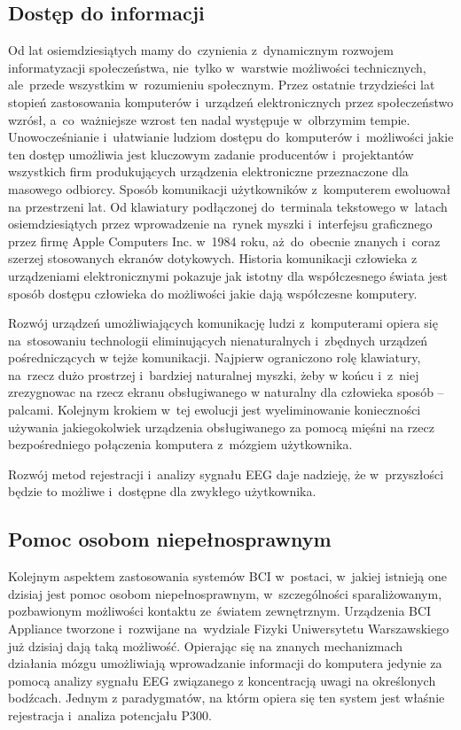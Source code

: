 \documentclass[licencjacka,openright]{pracamgr}
\begin{document}
\subsection{Dostęp do informacji}
Od lat osiemdziesiątych mamy do~czynienia z~dynamicznym rozwojem informatyzacji społeczeństwa, nie~tylko w~warstwie możliwości technicznych, ale~przede wszystkim w~rozumieniu społecznym. Przez ostatnie trzydzieści lat stopień zastosowania komputerów i~urządzeń elektronicznych przez społeczeństwo wzrósł, a~co~ważniejsze wzrost ten nadal występuje w~olbrzymim tempie. Unowocześnianie i~ułatwianie ludziom dostępu do~komputerów i~możliwości jakie ten dostęp umożliwia jest kluczowym zadanie producentów i~projektantów wszystkich firm produkujących urządzenia elektroniczne przeznaczone dla masowego odbiorcy. Sposób komunikacji użytkowników z~komputerem ewoluował na przestrzeni lat. Od klawiatury podłączonej do~terminala tekstowego w~latach osiemdziesiątych przez wprowadzenie na~rynek myszki i~interfejsu graficznego przez firmę Apple Computers Inc. w~1984 roku, aż~do~obecnie znanych i~coraz szerzej stosowanych ekranów dotykowych. Historia komunikacji człowieka z urządzeniami elektronicznymi pokazuje jak istotny dla współczesnego świata jest sposób dostępu człowieka do możliwości jakie dają współczesne komputery.

Rozwój urządzeń umożliwiających komunikację ludzi z~komputerami opiera się na~stosowaniu technologii eliminujących nienaturalnych i~zbędnych urządzeń pośredniczących w tejże komunikacji. Najpierw ograniczono rolę klawiatury, na~rzecz dużo prostrzej i~bardziej naturalnej myszki, żeby w końcu i~z~niej zrezygnowac na rzecz ekranu obsługiwanego w naturalny dla człowieka sposób -- palcami. Kolejnym krokiem w~tej ewolucji jest wyeliminowanie konieczności używania jakiegokolwiek urządzenia obsługiwanego za pomocą mięśni na rzecz bezpośredniego połączenia komputera z~mózgiem użytkownika.

Rozwój metod rejestracji i~analizy sygnału EEG daje nadzieję, że w~przyszłości będzie to możliwe i~dostępne dla zwykłego użytkownika.
\subsection{Pomoc osobom niepełnosprawnym}
Kolejnym aspektem zastosowania systemów BCI w~postaci, w~jakiej istnieją one dzisiaj jest pomoc osobom niepełnosprawnym, w~szczególności sparaliżowanym, pozbawionym możliwości kontaktu ze~światem zewnętrznym. Urządzenia BCI Appliance tworzone i~rozwijane na~wydziale Fizyki Uniwersytetu Warszawskiego już dzisiaj dają taką możliwość. Opierając się na znanych mechanizmach działania mózgu umożliwiają wprowadzanie informacji do komputera jedynie za pomocą analizy sygnału EEG związanego z koncentracją uwagi na określonych bodźcach. Jednym z paradygmatów, na którm opiera się ten system jest właśnie rejestracja i~analiza potencjału P300.
\end{document}
